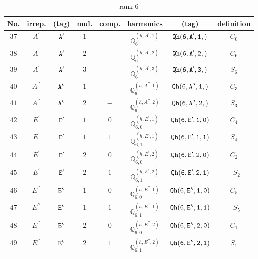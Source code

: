 \documentclass[fleqn,8pt]{jsarticle}
\begin{document}
\begin{table}[ht!]
\begin{center}
\caption{rank 6}
\renewcommand{\arraystretch}{1.3}
\begin{tabular}{cccccccc} \hline \hline
No. & irrep. & (tag) & mul. & comp. & harmonics & (tag) & definition \\ \hline
$ 37 $ & $ A^{\prime} $ & $ {\tt A'} $ & $ 1 $ & $ - $ & $ \mathbb{Q}_{6}^{(h,A^{\prime},1)} $ & $ {\tt Qh(6,A',1,)} $ & $ C_{0} $ \\
$ 38 $ & $ A^{\prime} $ & $ {\tt A'} $ & $ 2 $ & $ - $ & $ \mathbb{Q}_{6}^{(h,A^{\prime},2)} $ & $ {\tt Qh(6,A',2,)} $ & $ C_{6} $ \\
$ 39 $ & $ A^{\prime} $ & $ {\tt A'} $ & $ 3 $ & $ - $ & $ \mathbb{Q}_{6}^{(h,A^{\prime},3)} $ & $ {\tt Qh(6,A',3,)} $ & $ S_{6} $ \\
$ 40 $ & $ A^{\prime\prime} $ & $ {\tt A''} $ & $ 1 $ & $ - $ & $ \mathbb{Q}_{6}^{(h,A^{\prime\prime},1)} $ & $ {\tt Qh(6,A'',1,)} $ & $ C_{3} $ \\
$ 41 $ & $ A^{\prime\prime} $ & $ {\tt A''} $ & $ 2 $ & $ - $ & $ \mathbb{Q}_{6}^{(h,A^{\prime\prime},2)} $ & $ {\tt Qh(6,A'',2,)} $ & $ S_{3} $ \\
$ 42 $ & $ E^{\prime} $ & $ {\tt E'} $ & $ 1 $ & $ 0 $ & $ \mathbb{Q}_{6,0}^{(h,E^{\prime},1)} $ & $ {\tt Qh(6,E',1,0)} $ & $ C_{4} $ \\
$ 43 $ & $ E^{\prime} $ & $ {\tt E'} $ & $ 1 $ & $ 1 $ & $ \mathbb{Q}_{6,1}^{(h,E^{\prime},1)} $ & $ {\tt Qh(6,E',1,1)} $ & $ S_{4} $ \\
$ 44 $ & $ E^{\prime} $ & $ {\tt E'} $ & $ 2 $ & $ 0 $ & $ \mathbb{Q}_{6,0}^{(h,E^{\prime},2)} $ & $ {\tt Qh(6,E',2,0)} $ & $ C_{2} $ \\
$ 45 $ & $ E^{\prime} $ & $ {\tt E'} $ & $ 2 $ & $ 1 $ & $ \mathbb{Q}_{6,1}^{(h,E^{\prime},2)} $ & $ {\tt Qh(6,E',2,1)} $ & $ - S_{2} $ \\
$ 46 $ & $ E^{\prime\prime} $ & $ {\tt E''} $ & $ 1 $ & $ 0 $ & $ \mathbb{Q}_{6,0}^{(h,E^{\prime\prime},1)} $ & $ {\tt Qh(6,E'',1,0)} $ & $ C_{5} $ \\
$ 47 $ & $ E^{\prime\prime} $ & $ {\tt E''} $ & $ 1 $ & $ 1 $ & $ \mathbb{Q}_{6,1}^{(h,E^{\prime\prime},1)} $ & $ {\tt Qh(6,E'',1,1)} $ & $ - S_{5} $ \\
$ 48 $ & $ E^{\prime\prime} $ & $ {\tt E''} $ & $ 2 $ & $ 0 $ & $ \mathbb{Q}_{6,0}^{(h,E^{\prime\prime},2)} $ & $ {\tt Qh(6,E'',2,0)} $ & $ C_{1} $ \\
$ 49 $ & $ E^{\prime\prime} $ & $ {\tt E''} $ & $ 2 $ & $ 1 $ & $ \mathbb{Q}_{6,1}^{(h,E^{\prime\prime},2)} $ & $ {\tt Qh(6,E'',2,1)} $ & $ S_{1} $ \\
 \hline \hline
\end{tabular}
\end{center}
\end{table}
\end{document}

